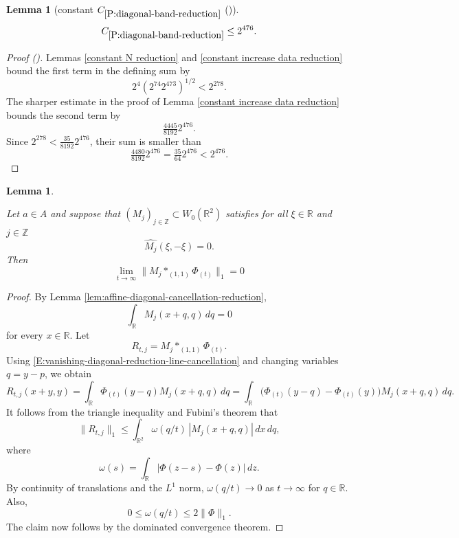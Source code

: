 \documentclass[12pt,reqno]{amsart}
\newcommand{\auto}{{({\tiny\faCar})}}
\theoremstyle{plain}
\newtheorem{lemma}[theorem]{Lemma}
\numberwithin{equation}{section}
\theoremstyle{remark}
\newcommand{\using}[1]{}
\newcommand{\Z}{{\mathbb Z}}
\newcommand{\R}{{\mathbb R}}
\begin{document}
\begin{lemma}[constant $C_{\ref{P:diagonal-band-reduction}}$ \auto]\label{constant diagonal band reduction}\using{constant N reduction}\using{constant increase data reduction}
\begin{equation}\label{constant diagonal band reduction bound}
C_{\ref{P:diagonal-band-reduction}}\le2^{476}.
\end{equation}
\end{lemma}
\begin{proof}[Proof \auto]
Lemmas \ref{constant N reduction} and \ref{constant increase data reduction} bound the first term in the defining sum by
\[
2^4(2^{74}2^{473})^{1/2}<2^{278}.
\]
The sharper estimate in the proof of Lemma \ref{constant increase data reduction} bounds the second term by
\[
\tfrac{4445}{8192}2^{476}.
\]
Since $2^{278}<\frac{35}{8192}2^{476}$, their sum is smaller than
\[
\tfrac{4480}{8192}2^{476}=\tfrac{35}{64}2^{476}<2^{476}.
\]
\end{proof}


\begin{lemma}\label{lem:L1-reduction}\using{lem:affine-diagonal-cancellation-reduction}

Let $a\in A$ and suppose that $(M_j)_{j\in\Z}\subset W_0(\R^2)$ satisfies for all $\xi \in \R$ and $j\in \Z$
\begin{equation}\label{auto:vanishing-diagonal-assumption}
\widehat{M_j}(\xi,-\xi)=0.
\end{equation}
Then
\begin{equation}\label{auto:vanishing-diagonal-large-scale-limit}    \lim_{t\to\infty}
    \| M_j\ast_{(1,1)}\Phi_{(t)} \|_1
    =0
    \end{equation}
\end{lemma}

\begin{proof}


By Lemma \ref{lem:affine-diagonal-cancellation-reduction},
\begin{equation}
    \label{E:vanishing-diagonal-reduction-line-cancellation}
    \int_{\mathbb R}M_j(x+q,q)\,dq=0
\end{equation}
for every \(x\in\mathbb R\).
Let
\[
R_{t,j}=M_j\ast_{(1,1)}\Phi_{(t)}.
\]
Using \eqref{E:vanishing-diagonal-reduction-line-cancellation} and
changing variables \(q=y-p\), we obtain
\[
R_{t,j}(x+y,y) = \int_{\mathbb R} \Phi_{(t)}(y-q)M_j(x+q,q)\,dq = \int_{\mathbb R} \bigl(\Phi_{(t)}(y-q)-\Phi_{(t)}(y)\bigr) M_j(x+q,q)\,dq.
\]
It follows from the triangle inequality and Fubini's theorem that
    \[
    \|R_{t,j}\|_1
    \le
    \int_{\mathbb R^2}
    \omega(q/t)\,
    |M_j(x+q,q)|\,dx\,dq,
    \]
    where
    \[
    \omega(s)
    =
    \int_{\mathbb R}|\Phi(z-s)-\Phi(z)|\,dz.
    \]
    By continuity of translations and the $L^1$ norm,
    \(\omega(q/t)\to0\) as \(t\to\infty\) for   \(q\in\mathbb R\).
    Also,
    \[
    0\le \omega(q/t)\le 2\|\Phi\|_1.
    \]
The claim now follows by the
    dominated convergence theorem.
\end{proof}
\end{document}
